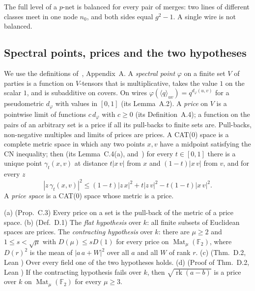 \documentclass[10pt]{amsart}
\theoremstyle{plain}
\theoremstyle{definition}
\theoremstyle{remark}
\numberwithin{equation}{section}
\newcommand{\F}{\mathbb{F}}
\newcommand{\rk}{\operatorname{rk}}
\newcommand{\Mat}{\operatorname{Mat}}
\newcommand{\dd}[2]{|#1\,#2|}
\begin{document}
The full level of a $p$-net is balanced for every pair of merges: two lines of different classes meet
in one node $n_0$, and both sides equal $g^2-1$. A single wire is not balanced.

\subsection{Spectral points, prices and the two hypotheses}\label{sec:prices}
We use the definitions of~\cite{AnthropicVP}, Appendix~A. A \emph{spectral point} $\varphi$ on a finite
set $V$ of parties is a function on $V$-tensors that is multiplicative, takes the value $1$ on the
scalar $1$, and is subadditive on covers. On wires $\varphi(\langle q\rangle_{uv})=q^{d_\varphi(u,v)}$
for a pseudometric $d_\varphi$ with values in $[0,1]$ (its Lemma~A.2). A \emph{price} on $V$ is a
pointwise limit of functions $c\,d_\varphi$ with $c\ge0$ (its Definition~A.4); a function on the pairs of
an arbitrary set is a price if all its pull-backs to finite sets are. Pull-backs, non-negative
multiples and limits of prices are prices. A CAT(0) space is a complete metric space in which any two
points $x,v$ have a midpoint satisfying the CN inequality; then (its Lemma~C.4(a), and~\cite{BH99})
for every $t\in[0,1]$ there is a unique point $\gamma_t(x,v)$ at distance $t\dd xv$ from $x$ and
$(1-t)\dd xv$ from $v$, and for every $z$
\begin{equation}\label{eq:CN}
\dd z{\gamma_t(x,v)}^2\le(1-t)\dd zx^2+t\dd zv^2-t(1-t)\dd xv^2 .
\end{equation}
A \emph{price space} is a CAT(0) space whose metric is a price.

\begin{imported}\label{imp:AN}
(a) (Prop.~C.3) Every price on a set is the pull-back of the metric of a price space.
(b) (Def.~D.1) The \emph{flat hypothesis} over $k$: all finite subsets of Euclidean spaces are prices.
The \emph{contracting hypothesis} over $k$: there are $\mu\ge2$ and $1\le s<\sqrt\mu$ with
$D(\mu)\le sD(1)$ for every price on $\Mat_\mu(\F_2)$, where $D(r)^2$ is the mean of $\dd a{a+W}^2$ over
all $a$ and all $W$ of rank $r$.
(c) (Thm.~D.2, Lean ) Over every field one of the two hypotheses holds.
(d) (Proof of Thm.~D.2, Lean ) If the contracting hypothesis fails over $k$,
then $\sqrt{\rk(a-b)}$ is a price over $k$ on $\Mat_\mu(\F_2)$ for every $\mu\ge3$.
\end{imported}
\end{document}
